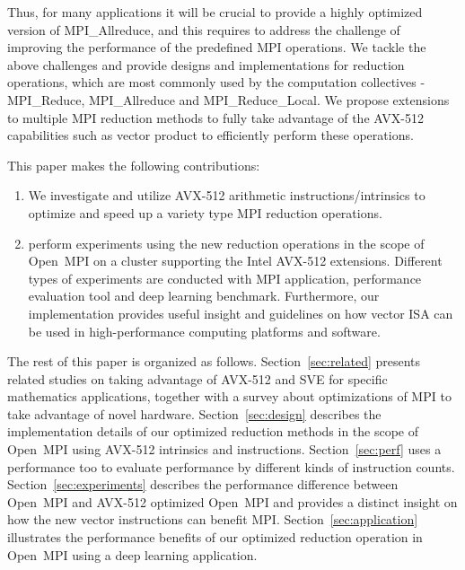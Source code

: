 \documentclass[5p,times,twocolumn]{elsarticle}
\newcommand{\ompi}[0]{Open~MPI\xspace}
\newcommand{\mpi}[0]{\textsc{MPI}\xspace}
\newcommand{\sve}[0]{\textsc{SVE}\xspace}
\begin{document}
Thus, for many applications it will be crucial to provide a highly optimized
version of MPI\_Allreduce, and this requires to address the challenge of improving the performance of the predefined MPI operations. We tackle the above challenges and provide designs and implementations
for reduction operations, which are most commonly used by the computation
collectives - MPI\_Reduce, MPI\_Allreduce and MPI\_Reduce\_Local.
We propose extensions to multiple \mpi reduction methods to fully take
advantage of the AVX-512 capabilities such as vector product to efficiently
perform these operations.

This paper makes the following contributions:
\begin{enumerate}
  \item We investigate and utilize AVX-512 arithmetic instructions/intrinsics to optimize and
  speed up a variety type \mpi reduction operations.
%
  \item perform experiments using the new reduction operations in the scope
  of \ompi on a cluster supporting the Intel AVX-512 extensions. Different types of
  experiments are conducted with \mpi application, performance evaluation tool and
  deep learning benchmark.
  Furthermore, our implementation provides useful insight and guidelines on how vector
  ISA can be used in high-performance computing platforms and software.
\end{enumerate}

The rest of this paper is organized as follows.
Section~\ref{sec:related} presents related studies on taking advantage of AVX-512 and \sve for specific mathematics applications, together with a survey about optimizations of \mpi to take advantage of novel hardware.
Section~\ref{sec:design} describes the implementation details of our optimized reduction methods in the scope of \ompi using AVX-512 intrinsics and instructions.
Section~\ref{sec:perf} uses a performance too to evaluate performance by different kinds of instruction counts.
Section~\ref{sec:experiments} describes the performance difference between
\ompi and AVX-512 optimized \ompi and provides a distinct insight on how the
new vector instructions can benefit \mpi.
Section~\ref{sec:application} illustrates the performance benefits of our
optimized reduction operation in \ompi using a deep learning application.
\end{document}
